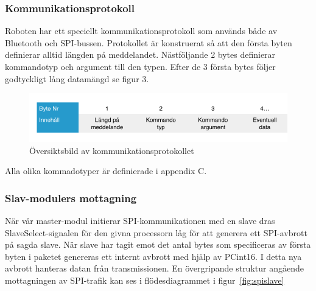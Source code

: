 \documentclass[a4paper,12pt,fleqn]{article}
\begin{document}
\subsubsection{Kommunikationsprotokoll}
Roboten har ett speciellt kommunikationsprotokoll som används både av Bluetooth och SPI-bussen. Protokollet är konstruerat så att den första byten definierar alltid längden på meddelandet. Nästföljande 2 bytes definierar kommandotyp och argument till den typen. Efter de 3 första bytes följer godtyckligt lång datamängd se figur 3.

\begin{figure}[htp] %
  \begin{center}
  \includegraphics[keepaspectratio=true,scale=0.6]{bilder/Bussprotokoll.png}  %
  \end{center}
  \caption{Översiktsbild av kommunikationsprotokollet} %
  \label{fig:bussprotocol}
\end{figure}

Alla olika kommadotyper är definierade i appendix C.

\subsubsection{Slav-modulers mottagning}
När vår master-modul initierar SPI-kommunikationen med en slave dras SlaveSelect-signalen för den givna processorn låg för att generera ett SPI-avbrott på sagda slave. När slave har tagit emot det antal bytes som specificeras av första byten i paketet genereras ett internt avbrott med hjälp av PCint16. I detta nya avbrott hanteras datan från transmissionen. En övergripande struktur angående mottagningen av SPI-trafik kan ses i flödesdiagrammet i figur~\ref{fig:spislave}
\end{document}
